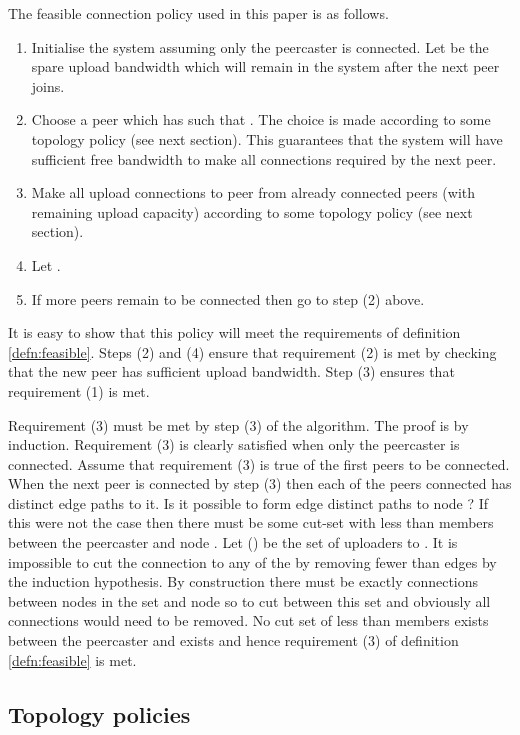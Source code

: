 \begin{definition}\label{defn:thisfeasible}
The feasible connection policy used in this paper is as follows.
\begin{enumerate}
\item Initialise the system assuming only the peercaster is connected.  Let
 be the spare upload bandwidth which will remain in the system
after the next peer joins.
\item Choose a peer  which has  
such that .  The choice is made according to some topology
policy (see next section).   This  guarantees that the system will have sufficient 
free bandwidth to make all  connections required by the next peer.
\item Make all  upload connections to peer  from already connected peers (with
remaining upload capacity) according to some topology
policy (see next section).
\item Let .
\item If more peers remain to be connected then go to step (2) above.
\end{enumerate}
\end{definition}

It is easy to show that this policy will meet the requirements of
definition \ref{defn:feasible}.  Steps (2) and (4) ensure that requirement (2)
is met by checking that the new peer has sufficient upload bandwidth.  
Step (3) ensures that requirement (1) is met.  


Requirement (3) must be met by step (3) of the algorithm.  The proof is
by induction.  Requirement (3) is clearly satisfied when only the peercaster
is connected.
Assume that requirement (3)
is true of the first  peers to be connected.  When the next peer 
is connected by step (3) then each of the peers connected has  distinct edge
paths to it.  Is it possible to form  edge distinct paths
to node ?  If this were not the case then there must be some cut-set with less
than  members between the peercaster and node .  Let  ()
be the set of uploaders to .  It is impossible to cut the connection to any of
the  by removing fewer than  edges by the induction hypothesis.  By construction
there must be 
exactly 
connections between nodes in the set  
and node  so to cut between this set
and  obviously all  connections
would need to be removed.  No cut set of less than  members exists between the
peercaster and  exists and hence requirement (3) of definition \ref{defn:feasible}
is met.

\subsection{Topology policies}
\label{sec:toppolicy}

